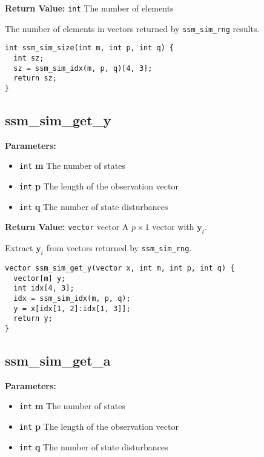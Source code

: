 \documentclass[]{book}
\providecommand{\tightlist}{%
  \setlength{\itemsep}{0pt}\setlength{\parskip}{0pt}}
\renewcommand{\vec}[1]{\boldsymbol{#1}}
\begin{document}
\textbf{Return Value:} \texttt{int} The number of elements

The number of elements in vectors returned by \texttt{ssm\_sim\_rng}
results.

\begin{verbatim}
int ssm_sim_size(int m, int p, int q) {
  int sz;
  sz = ssm_sim_idx(m, p, q)[4, 3];
  return sz;
}
\end{verbatim}

\subsection{ssm\_sim\_get\_y}\label{ssmux5fsimux5fgetux5fy}

\textbf{Parameters:}

\begin{itemize}
\tightlist
\item
  \texttt{int} \textbf{m} The number of states
\item
  \texttt{int} \textbf{p} The length of the observation vector
\item
  \texttt{int} \textbf{q} The number of state disturbances
\end{itemize}

\textbf{Return Value:} \texttt{vector} vector A \(p \times 1\) vector
with \(\vec{y}_t\).

Extract \(\vec{y}_t\) from vectors returned by \texttt{ssm\_sim\_rng}.

\begin{verbatim}
vector ssm_sim_get_y(vector x, int m, int p, int q) {
  vector[m] y;
  int idx[4, 3];
  idx = ssm_sim_idx(m, p, q);
  y = x[idx[1, 2]:idx[1, 3]];
  return y;
}
\end{verbatim}

\subsection{ssm\_sim\_get\_a}\label{ssmux5fsimux5fgetux5fa}

\textbf{Parameters:}

\begin{itemize}
\tightlist
\item
  \texttt{int} \textbf{m} The number of states
\item
  \texttt{int} \textbf{p} The length of the observation vector
\item
  \texttt{int} \textbf{q} The number of state disturbances
\end{itemize}
\end{document}
